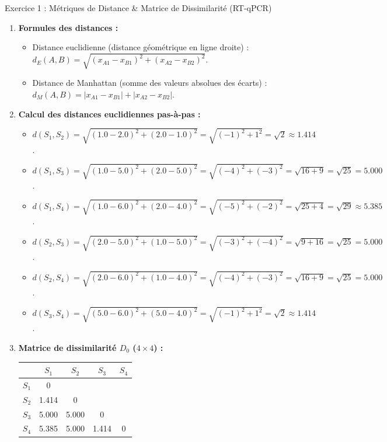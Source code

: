 \documentclass[11pt,a4paper]{article}
\begin{document}

\begin{solutionbox}{Exercice 1 : Métriques de Distance \& Matrice de Dissimilarité (RT-qPCR)}
\begin{enumerate}[label=\textbf{\alph*.}]
  \item \textbf{Formules des distances :}
  \begin{itemize}
    \item Distance euclidienne (distance géométrique en ligne droite) : $d_E(A, B) = \sqrt{(x_{A1} - x_{B1})^2 + (x_{A2} - x_{B2})^2}$.
    \item Distance de Manhattan (somme des valeurs absolues des écarts) : $d_M(A, B) = |x_{A1} - x_{B1}| + |x_{A2} - x_{B2}|$.
  \end{itemize}

  \item \textbf{Calcul des distances euclidiennes pas-à-pas :}
  \begin{itemize}
    \item $d(S_1, S_2) = \sqrt{(1.0 - 2.0)^2 + (2.0 - 1.0)^2} = \sqrt{(-1)^2 + 1^2} = \sqrt{2} \approx \mathbf{1.414}$.
    \item $d(S_1, S_3) = \sqrt{(1.0 - 5.0)^2 + (2.0 - 5.0)^2} = \sqrt{(-4)^2 + (-3)^2} = \sqrt{16 + 9} = \sqrt{25} = \mathbf{5.000}$.
    \item $d(S_1, S_4) = \sqrt{(1.0 - 6.0)^2 + (2.0 - 4.0)^2} = \sqrt{(-5)^2 + (-2)^2} = \sqrt{25 + 4} = \sqrt{29} \approx \mathbf{5.385}$.
    \item $d(S_2, S_3) = \sqrt{(2.0 - 5.0)^2 + (1.0 - 5.0)^2} = \sqrt{(-3)^2 + (-4)^2} = \sqrt{9 + 16} = \sqrt{25} = \mathbf{5.000}$.
    \item $d(S_2, S_4) = \sqrt{(2.0 - 6.0)^2 + (1.0 - 4.0)^2} = \sqrt{(-4)^2 + (-3)^2} = \sqrt{16 + 9} = \sqrt{25} = \mathbf{5.000}$.
    \item $d(S_3, S_4) = \sqrt{(5.0 - 6.0)^2 + (5.0 - 4.0)^2} = \sqrt{(-1)^2 + 1^2} = \sqrt{2} \approx \mathbf{1.414}$.
  \end{itemize}

  \item \textbf{Matrice de dissimilarité $D_0$ ($4 \times 4$) :}
  \begin{center}
    \small
    \begin{tabular}{lcccc}
      \toprule
      & \textbf{$S_1$} & \textbf{$S_2$} & \textbf{$S_3$} & \textbf{$S_4$} \\
      \midrule
      \textbf{$S_1$} & 0 & & & \\
      \textbf{$S_2$} & 1.414 & 0 & & \\
      \textbf{$S_3$} & 5.000 & 5.000 & 0 & \\
      \textbf{$S_4$} & 5.385 & 5.000 & 1.414 & 0 \\
      \bottomrule
    \end{tabular}
  \end{center}


\end{enumerate}
\end{solutionbox}
\end{document}
